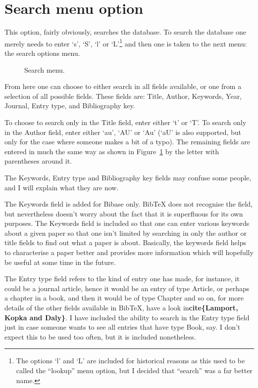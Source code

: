 \documentclass[12pt,a4paper]{book}
\newcommand {\fig}[1] {Figure~\ref{#1}}
\begin{document}
\section{Search menu option}

This option, fairly obviously, searches the database.  To search the database 
one merely
needs to enter `s', `S', `l' or `L'\footnote{The options `l' and `L' 
are included for historical reasons as this used to be called the 
``lookup'' menu option, but I decided that ``search'' was a far better 
name.} and then one is taken to the next menu: the 
search options menu.
\begin{figure}[!ht]
\centerline{}
\caption{Search menu.}
\label{fig:search}
\end{figure}
From here one can choose to either search in all fields available, or 
one from a selection of all possible fields.  These fields are: 
Title, Author, Keywords, Year, Journal, Entry type, and Bibliography 
key.

To choose to search only in the Title field, enter either `t' or `T'.  
To search only in the Author field, enter either `au', `AU' or `Au' 
(`aU' is also supported, but only for the case where someone makes a 
bit of a typo).  The remaining fields are entered in much the same 
way as shown in \fig{fig:search} by the letter with parentheses 
around it.

The Keywords, Entry type and Bibliography key fields may confuse some 
people, and I will explain what they are now.

The Keywords field is added for Bibase only.  BibTeX does not 
recognise the field, but nevertheless doesn't worry about the fact 
that it is superfluous for its own purposes.  The Keywords field is 
included so that one can enter various keywords about a given paper 
so that one isn't limited by searching in only the author or title 
fields to find out what a paper is about.  Basically, the keywords 
field helps to characterise a paper better and provides more 
information which will hopefully be useful at some time in the future.

The Entry type field refers to the kind of entry one has made, for 
instance, it could be a journal article, hence it would be an entry of 
type Article, or perhaps a chapter in a book, and then it would be of 
type Chapter and so on, for more details of the other fields 
available in BibTeX, have a look in{\bf cite\{Lamport, Kopka and 
Daly\}}.  I have included the ability 
to search in the Entry type field just in case someone wants to see 
all entries that have type Book, say.  I don't expect this to be used 
too often, but it is included nonetheless.
\end{document}
